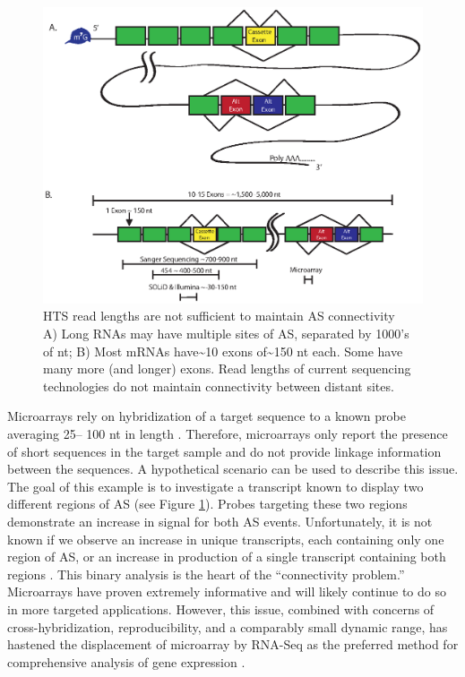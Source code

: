     \begin{figure} %
      \centering 
      \includegraphics{Figures/Intro/SeqLengths_and_Connectivity.eps}
      \caption[HTS read lengths are not sufficient to maintain AS connectivity]
      {
        HTS read lengths are not sufficient to maintain AS connectivity\\[0.25cm]
        A) Long RNAs may have multiple sites of AS, separated by 1000's of nt; B) Most mRNAs have\textasciitilde10 exons of\textasciitilde150 nt each. Some have many more (and longer) exons. Read lengths of current sequencing technologies do not maintain connectivity between distant sites.
        }
      \label{Intro:fig:NoConnectivityInHTSMethods}
      \end{figure}

    Microarrays rely on hybridization of a target sequence to a known probe averaging 25-- 100 nt in length \citep{Southern2001}. Therefore, microarrays  only report the presence of short sequences in the target sample and do not provide linkage information between the sequences. A hypothetical scenario can be used to describe this issue. The goal of this example is to investigate a transcript known to display two different regions of AS (see Figure \ref{Intro:fig:NoConnectivityInHTSMethods}). Probes targeting these two regions demonstrate an increase in signal for both AS events. Unfortunately, it is not known if we observe an increase in unique transcripts, each containing only one region of AS, or an increase in production of a single transcript containing both regions \citep{Calarco2007}. This binary analysis is the heart of the ``connectivity problem.'' Microarrays have proven extremely informative and will likely continue to do so in more targeted applications. However, this issue, combined with concerns of cross-hybridization, reproducibility, and a comparably small dynamic range, has hastened the displacement of microarray by RNA-Seq as the preferred method for comprehensive analysis of gene expression \citep{Shendure2008}.

